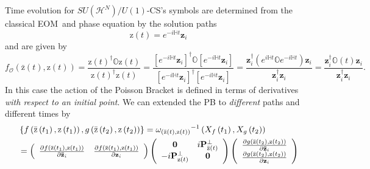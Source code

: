 \documentclass[aps,preprint]{revtex4}%
\begin{document}
Time evolution for $SU\left(  \mathcal{H}^{N}\right)  /U\left(  1\right)
$-CS's symbols are determined from the classical EOM\ and phase equation by
the solution paths
\begin{equation}
\mathrm{z}\left(  t\right)  =e^{-i\mathbb{H}t}\mathbf{z}_{i}%
\end{equation}
and are given by
\begin{equation}
f_{\mathcal{O}}\left(  \mathrm{\bar{z}}\left(  t\right)  \mathrm{,z}\left(
t\right)  \right)  =\frac{\mathrm{z}\left(  t\right)  ^{\dagger}%
\mathbb{O}\mathrm{z}\left(  t\right)  }{\mathrm{z}\left(  t\right)  ^{\dagger
}\mathrm{z}\left(  t\right)  }=\frac{\left[  e^{-i\mathbb{H}t}\mathbf{z}%
_{i}\right]  ^{\dagger}\mathbb{O}\left[  e^{-i\mathbb{H}t}\mathbf{z}%
_{i}\right]  }{\left[  e^{-i\mathbb{H}t}\mathbf{z}_{i}\right]  ^{\dagger
}\left[  e^{-i\mathbb{H}t}\mathbf{z}_{i}\right]  }=\frac{\mathbf{z}%
_{i}^{\dagger}\left(  e^{i\mathbb{H}t}\mathbb{O}e^{-i\mathbb{H}t}\right)
\mathbf{z}_{i}}{\mathbf{z}_{i}^{\dagger}\mathbf{z}_{i}}=\frac{\mathbf{z}%
_{i}^{\dagger}\mathbb{O}\left(  t\right)  \mathbf{z}_{i}}{\mathbf{z}%
_{i}^{\dagger}\mathbf{z}_{i}}.
\end{equation}
In this case the action of the Poisson Bracket is defined in terms of
derivatives \emph{with respect to an initial point}.\emph{ }We can extended
the PB to \emph{different} paths and different times by
\begin{align}
& \left\{  f\left(  \mathrm{\bar{z}}\left(  t_{1}\right)  \mathrm{,z}\left(
t_{1}\right)  \right)  ,g\left(  \mathrm{\bar{z}}\left(  t_{2}\right)
\mathrm{,z}\left(  t_{2}\right)  \right)  \right\}  =\omega_{\left(
\mathrm{\bar{z}}\left(  t\right)  \mathrm{,z}\left(  t\right)  \right)  }%
{}^{-1}\left(  X_{f}\left(  t_{1}\right)  ,X_{g}\left(  t_{2}\right)  \right)
\nonumber\\
& =\left(
\begin{array}
[c]{cc}%
\frac{\partial f\left(  \mathrm{\bar{z}}\left(  t_{1}\right)  \mathrm{,z}%
\left(  t_{1}\right)  \right)  }{\partial\mathbf{\bar{z}}_{i}} &
\frac{\partial f\left(  \mathrm{\bar{z}}\left(  t_{1}\right)  \mathrm{,z}%
\left(  t_{1}\right)  \right)  }{\partial\mathbf{z}_{i}}%
\end{array}
\right)  \left(
\begin{array}
[c]{cc}%
\mathbf{0} & i\mathbf{P}_{\mathrm{\bar{z}}\left(  t\right)  }^{\bot}\\
-i\mathbf{P}_{\mathrm{z}\left(  t\right)  }^{\bot} & \mathbf{0}%
\end{array}
\right)  \left(
\begin{array}
[c]{c}%
\frac{\partial g\left(  \mathrm{\bar{z}}\left(  t_{2}\right)  \mathrm{,z}%
\left(  t_{2}\right)  \right)  }{\partial\mathbf{\bar{z}}_{i}}\\
\frac{\partial g\left(  \mathrm{\bar{z}}\left(  t_{2}\right)  \mathrm{,z}%
\left(  t_{2}\right)  \right)  }{\partial\mathbf{z}_{i}}%
\end{array}
\right)
\end{align}
\end{document}
